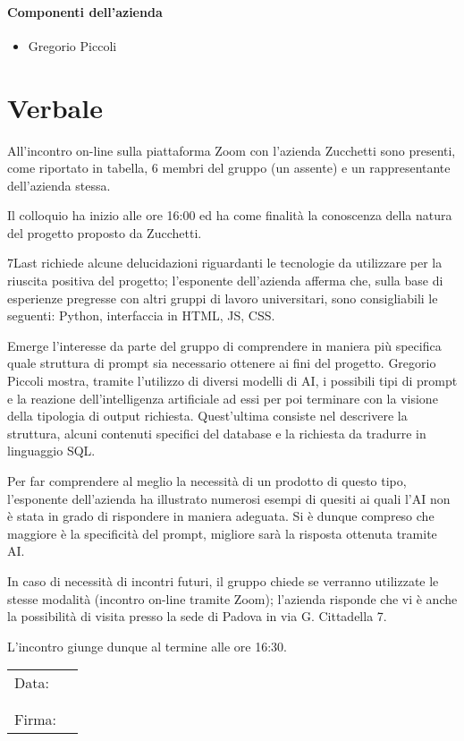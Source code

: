 \documentclass[italian,12pt]{article} %
\begin{document}
\paragraph{Componenti dell'azienda}

\begin{itemize}
	\item Gregorio Piccoli
\end{itemize}

\newpage

\section{Verbale}
\begin{flushleft}

All’incontro on-line sulla piattaforma Zoom con l’azienda Zucchetti sono presenti, come riportato in tabella, 6 membri del gruppo 
(un assente) e un rappresentante dell’azienda stessa.

Il colloquio ha inizio alle ore 16:00 ed ha come finalità la conoscenza della natura del progetto proposto da Zucchetti.
	
7Last richiede alcune delucidazioni riguardanti le tecnologie da utilizzare per la riuscita positiva del progetto; 
l’esponente dell’azienda afferma che, sulla base di esperienze pregresse con altri gruppi di lavoro universitari, 
sono consigliabili le seguenti: Python, interfaccia in HTML, JS, CSS.
	
Emerge l’interesse da parte del gruppo di comprendere in maniera più specifica quale struttura di prompt sia necessario ottenere 
ai fini del progetto. Gregorio Piccoli mostra, tramite l’utilizzo di diversi modelli di AI, i possibili tipi di prompt e la reazione 
dell’intelligenza artificiale ad essi per poi terminare con la visione della tipologia di output richiesta. Quest’ultima consiste nel 
descrivere la struttura, alcuni contenuti specifici del database e la richiesta da tradurre in linguaggio SQL.
	
Per far comprendere al meglio la necessità di un prodotto di questo tipo, l’esponente dell’azienda ha illustrato numerosi esempi 
di quesiti ai quali l’AI non è stata in grado di rispondere in maniera adeguata. Si è dunque compreso che maggiore è la specificità 
del prompt, migliore sarà la risposta ottenuta tramite AI.
	
In caso di necessità di incontri futuri, il gruppo chiede se verranno utilizzate le stesse modalità (incontro on-line tramite Zoom); 
l’azienda risponde che vi è anche la possibilità di visita presso la sede di Padova in via G. Cittadella 7.
	
L’incontro giunge dunque al termine alle ore 16:30.

\end{flushleft}

\begin{table}[b]
	\begin{tabular}{@{}p{.5in}p{4in}@{}}
		Data:  & \hrulefill \\
			   &     		\\
			   &     		\\
		Firma: & \hrulefill \\
	\end{tabular}
	\end{table}
\end{document}

